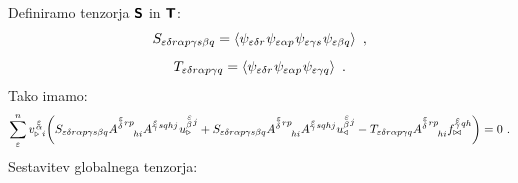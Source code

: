 Definiramo tenzorja $\bm{\mathsf{S}}$ in $\bm{\mathsf{T}}$:
\begin{equation}
   S_{\varepsilon \delta r \alpha p \gamma s \beta q} = \expval{ \psi_{ \varepsilon \delta r} \mkern1mu    \psi_{\varepsilon \alpha p} \mkern1mu    \psi_{\varepsilon \gamma s} \mkern1mu    \psi_{\varepsilon \beta q} } \ ,
\end{equation}
\begin{equation}
   T_{\varepsilon \delta r \alpha p \gamma q} = \expval{ \psi_{ \varepsilon \delta r} \mkern1mu    \psi_{\varepsilon \alpha p} \mkern1mu    \psi_{\varepsilon \gamma q} } \ .
\end{equation}
Tako imamo:
\begin{equation}
   \sum^n_\varepsilon v^{\mkern 2mu \substack{\varepsilon \\[-0.59mm] \alpha \\[-0.2mm]}}_{\triangleright \mkern5mu i}
   \qty( S_{\varepsilon \delta r \alpha p \gamma s \beta q}    A^{\substack{\mkern2mu \varepsilon \\[0.12mm] \delta} \mkern2mu r p}_{\mkern29mu hi}    A^{\substack{\mkern2mu \varepsilon \\[-0.59mm] \gamma} \mkern2mu s q h j} \mkern1mu     u^{\substack{\mkern2mu \varepsilon \\[0.14mm] \beta} \mkern2mu j}_\triangleright
   +
   S_{\varepsilon \delta r \alpha p \gamma s \beta q}    A^{\substack{\mkern2mu \varepsilon \\[0.12mm] \delta} \mkern2mu r p}_{\mkern29mu hi}    A^{\substack{\mkern2mu \varepsilon \\[-0.59mm] \gamma} \mkern2mu s q h j}    u^{\substack{\mkern2mu \varepsilon \\[0.14mm] \beta} \mkern2mu j}_\triangleleft
   -
   T_{\varepsilon \delta r \alpha p \gamma q}    A^{\substack{\mkern2mu \varepsilon \\[0.12mm] \delta} \mkern2mu r p}_{\mkern29mu hi}    f^{\substack{\mkern2mu \varepsilon \\[-0.59mm] \gamma} \mkern2mu q h}_{\bowtie}
   ) = 0 \ .
\end{equation}
Sestavitev globalnega tenzorja:
